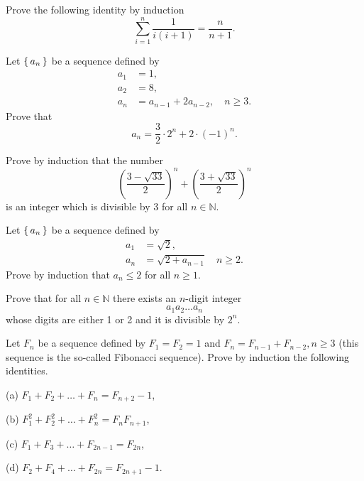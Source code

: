 \begin{exercise}\label{induction-4b}
Prove the following identity by induction
$$
\sum_{i=1}^n\frac{1}{i(i+1)}=\frac{n}{n+1}.
$$
\end{exercise}

\begin{exercise}\label{induction-5}
Let $\left\{\,a_n\,\right\}$ be a sequence defined by
\begin{align*}
a_1&=1,\\
a_2&=8,\\
a_n&=a_{n-1}+2a_{n-2},\quad n\geq 3.
\end{align*}
Prove that
$$
a_n=\frac{3}{2}\cdot 2^n+2 \cdot (-1)^n.
$$
\end{exercise}

\begin{exercise}\label{induction-6}
Prove by induction that the number 
$$
\left(\frac{3-\sqrt{33}}{2}\right)^n+\left(\frac{3+\sqrt{33}}{2}\right)^n
$$
is an integer which is divisible by 3 for all $n\in\mathbb{N}$.
\end{exercise}

\begin{exercise}\label{induction-7}
Let $\left\{\,a_n\,\right\}$ be a sequence defined by 
\begin{align*}
a_1&=\sqrt{2},\\
a_n&=\sqrt{2+a_{n-1}}\quad n\geq 2.
\end{align*}
Prove by induction that $a_n\leq 2$ for all $n\geq 1$.
\end{exercise}

\begin{exercise}\label{induction-8}
Prove that for all $n\in\mathbb{N}$ there exists an $n$-digit integer
$$
a_1a_2\ldots a_n
$$
whose digits are either 1 or 2 and it is divisible by $2^n$.
\end{exercise}

\begin{exercise}\label{induction-9}
Let $F_n$ be a sequence defined by $F_1=F_2=1$ and $F_n=F_{n-1}+F_{n-2}, n\geq 3$ (this sequence is the so-called Fibonacci sequence).
Prove by induction the following identities.

(a) $F_1+F_2+\ldots+F_n=F_{n+2}-1$,

(b) $F_1^2+F_2^2+\ldots+F_n^2=F_nF_{n+1}$,

(c) $F_1+F_3+\ldots+F_{2n-1}=F_{2n}$,

(d) $F_2+F_4+\ldots+F_{2n}=F_{2n+1}-1$.
\end{exercise}

